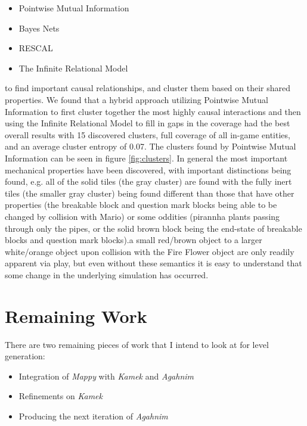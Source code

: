 \documentclass[12pt]{report}
\begin{document}
\begin{itemize}
 \setlength\itemsep{0.1mm}
\item Pointwise Mutual Information
\item Bayes Nets
\item RESCAL
\item The Infinite Relational Model
\end{itemize}

to find important causal relationships, and cluster them based on their shared properties.  We found that a hybrid approach utilizing Pointwise Mutual Information to first cluster together the most highly causal interactions and then using the Infinite Relational Model to fill in gaps in the coverage had the best overall results with 15 discovered clusters, full coverage of all in-game entities, and an average cluster entropy of 0.07.  The clusters found by Pointwise Mutual Information can be seen in figure \ref{fig:clusters}.  In general the most important mechanical properties have been discovered, with important distinctions being found, e.g. all of the solid tiles (the gray cluster) are found with the fully inert tiles (the smaller gray cluster) being found different than those that have other properties (the breakable block and question mark blocks being able to be changed by collision with Mario) or some oddities (pirannha plants passing through only the pipes, or the solid brown block being the end-state of breakable blocks and question mark blocks).a small red/brown object to a larger white/orange object upon collision with the Fire Flower object are only readily apparent via play, but even without these semantics it is easy to understand that some change in the underlying simulation has occurred. 

\section*{Remaining Work}

There are two remaining pieces of work that I intend to look at for level generation:

\begin{itemize}
\item Integration of \textit{Mappy} with \textit{Kamek} and \textit{Agahnim}
\item Refinements on \textit{Kamek}
\item Producing the next iteration of \textit{Agahnim}
\end{itemize}
\end{document}
